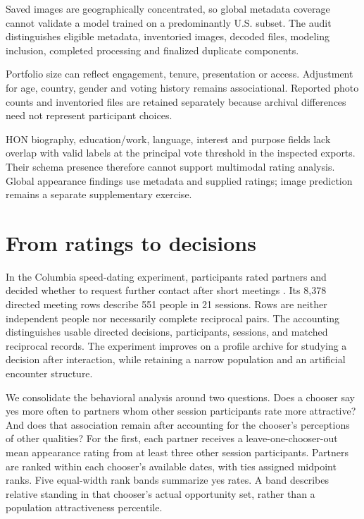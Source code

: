 
Saved images are geographically concentrated, so global metadata coverage cannot validate a model trained on a predominantly U.S. subset. The audit distinguishes eligible metadata, inventoried images, decoded files, modeling inclusion, completed processing and finalized duplicate components.

Portfolio size can reflect engagement, tenure, presentation or access. Adjustment for age, country, gender and voting history remains associational. Reported photo counts and inventoried files are retained separately because archival differences need not represent participant choices.

HON biography, education/work, language, interest and purpose fields lack overlap with valid labels at the principal vote threshold in the inspected exports. Their schema presence therefore cannot support multimodal rating analysis. Global appearance findings use metadata and supplied ratings; image prediction remains a separate supplementary exercise.

\section{From ratings to decisions}\label{sec:minds-decisions}

In the Columbia speed-dating experiment, participants rated partners and decided whether to request further contact after short meetings \citep{fisman2006}. Its 8,378 directed meeting rows describe 551 people in 21 sessions. Rows are neither independent people nor necessarily complete reciprocal pairs. The accounting distinguishes usable directed decisions, participants, sessions, and matched reciprocal records. The experiment improves on a profile archive for studying a decision after interaction, while retaining a narrow population and an artificial encounter structure.

We consolidate the behavioral analysis around two questions. Does a chooser say yes more often to partners whom other session participants rate more attractive? And does that association remain after accounting for the chooser's perceptions of other qualities? For the first, each partner receives a leave-one-chooser-out mean appearance rating from at least three other session participants. Partners are ranked within each chooser's available dates, with ties assigned midpoint ranks. Five equal-width rank bands summarize yes rates. A band describes relative standing in that chooser's actual opportunity set, rather than a population attractiveness percentile.

